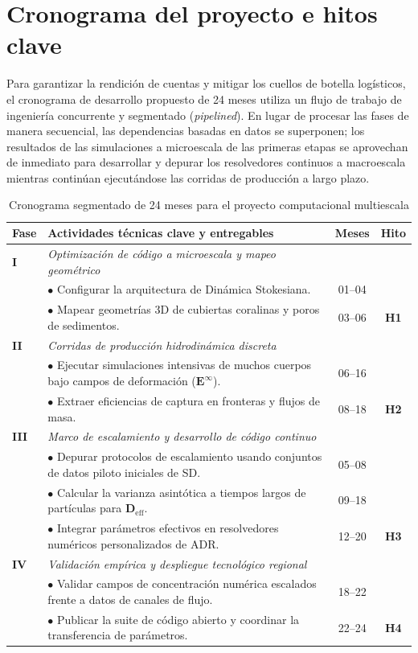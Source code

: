 \section{Cronograma del proyecto e hitos clave}
\label{sec:timeline}

Para garantizar la rendición de cuentas y mitigar los cuellos de botella logísticos, el cronograma de desarrollo propuesto de 24 meses utiliza un flujo de trabajo de ingeniería concurrente y segmentado (\emph{pipelined}). En lugar de procesar las fases de manera secuencial, las dependencias basadas en datos se superponen; los resultados de las simulaciones a microescala de las primeras etapas se aprovechan de inmediato para desarrollar y depurar los resolvedores continuos a macroescala mientras continúan ejecutándose las corridas de producción a largo plazo.

\begin{table}[H]
\centering
\caption{Cronograma segmentado de 24 meses para el proyecto computacional multiescala}
\label{tab:timeline}
\vspace{2mm}
\small
\begin{tabular}{llcc}
\toprule
\textbf{Fase} & \textbf{Actividades técnicas clave y entregables} & \textbf{Meses} & \textbf{Hito} \\
\midrule
\textbf{I} & \textit{Optimización de código a microescala y mapeo geométrico} & & \\
& $\bullet$ Configurar la arquitectura de Dinámica Stokesiana. & 01--04 & \\
& $\bullet$ Mapear geometrías 3D de cubiertas coralinas y poros de sedimentos. & 03--06 & \textbf{H1} \\
\addlinespace
\textbf{II} & \textit{Corridas de producción hidrodinámica discreta} & & \\
& $\bullet$ Ejecutar simulaciones intensivas de muchos cuerpos bajo campos de deformación ($\bm{{E}}^{\infty}$). & 06--16 & \\
& $\bullet$ Extraer eficiencias de captura en fronteras y flujos de masa. & 08--18 & \textbf{H2} \\
\addlinespace
\textbf{III} & \textit{Marco de escalamiento y desarrollo de código continuo} & & \\
& $\bullet$ Depurar protocolos de escalamiento usando conjuntos de datos piloto iniciales de SD. & 05--08 & \\
& $\bullet$ Calcular la varianza asintótica a tiempos largos de partículas para $\bm{D}_{\text{eff}}$. & 09--18 & \\
& $\bullet$ Integrar parámetros efectivos en resolvedores numéricos personalizados de ADR. & 12--20 & \textbf{H3} \\
\addlinespace
\textbf{IV} & \textit{Validación empírica y despliegue tecnológico regional} & & \\
& $\bullet$ Validar campos de concentración numérica escalados frente a datos de canales de flujo. & 18--22 & \\
& $\bullet$ Publicar la suite de código abierto y coordinar la transferencia de parámetros. & 22--24 & \textbf{H4} \\
\bottomrule
\end{tabular}
\end{table}

